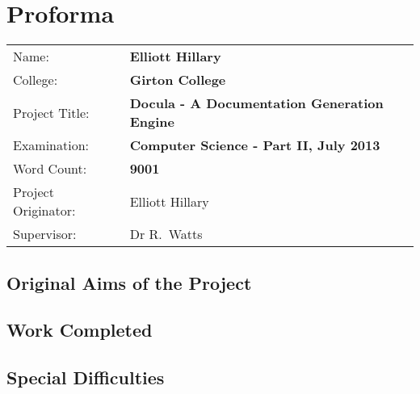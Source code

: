 \chapter*{Proforma}

{\large
\begin{tabular}{ll}
Name:               & \bf Elliott Hillary                       \\
College:            & \bf Girton College                     \\
Project Title:      & \bf Docula - A Documentation Generation Engine \\
Examination:        & \bf Computer Science - Part II, July 2013        \\
Word Count:         & \bf 9001                             \\
Project Originator: & Elliott Hillary                    \\
Supervisor:         & Dr R.~Watts                   \\
\end{tabular}
}

\section*{Original Aims of the Project}



\section*{Work Completed}



\section*{Special Difficulties}

